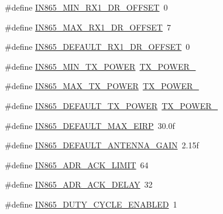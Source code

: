 \begin{DoxyCompactItemize}
\item 
\#define \mbox{\hyperlink{group___r_e_g_i_o_n_i_n865_ga898979e964849e97c76ef8417bf69990}{I\+N865\+\_\+\+M\+I\+N\+\_\+\+R\+X1\+\_\+\+D\+R\+\_\+\+O\+F\+F\+S\+ET}}~0
\item 
\#define \mbox{\hyperlink{group___r_e_g_i_o_n_i_n865_ga3211339c60a66ca9f9baad03eb4546d6}{I\+N865\+\_\+\+M\+A\+X\+\_\+\+R\+X1\+\_\+\+D\+R\+\_\+\+O\+F\+F\+S\+ET}}~7
\item 
\#define \mbox{\hyperlink{group___r_e_g_i_o_n_i_n865_ga6bd4f0c33ab266e3e197db4f45131cae}{I\+N865\+\_\+\+D\+E\+F\+A\+U\+L\+T\+\_\+\+R\+X1\+\_\+\+D\+R\+\_\+\+O\+F\+F\+S\+ET}}~0
\item 
\#define \mbox{\hyperlink{group___r_e_g_i_o_n_i_n865_ga91b8f9bdc09d452a2e6bbbad95544245}{I\+N865\+\_\+\+M\+I\+N\+\_\+\+T\+X\+\_\+\+P\+O\+W\+ER}}~\mbox{\hyperlink{group___r_e_g_i_o_n_gac9747c69350f34d485c3134e5a57655b}{T\+X\+\_\+\+P\+O\+W\+E\+R\+\_}}
\item 
\#define \mbox{\hyperlink{group___r_e_g_i_o_n_i_n865_ga6bd515d7c4fbad47210702da1d9396a3}{I\+N865\+\_\+\+M\+A\+X\+\_\+\+T\+X\+\_\+\+P\+O\+W\+ER}}~\mbox{\hyperlink{group___r_e_g_i_o_n_gab33618449f2a573142c463ab071ef8ed}{T\+X\+\_\+\+P\+O\+W\+E\+R\+\_}}
\item 
\#define \mbox{\hyperlink{group___r_e_g_i_o_n_i_n865_gafdbc3865fbf7785cdee80410d5769f84}{I\+N865\+\_\+\+D\+E\+F\+A\+U\+L\+T\+\_\+\+T\+X\+\_\+\+P\+O\+W\+ER}}~\mbox{\hyperlink{group___r_e_g_i_o_n_gab33618449f2a573142c463ab071ef8ed}{T\+X\+\_\+\+P\+O\+W\+E\+R\+\_}}
\item 
\#define \mbox{\hyperlink{group___r_e_g_i_o_n_i_n865_gababb492eaab442a1921c6e337b76eeb8}{I\+N865\+\_\+\+D\+E\+F\+A\+U\+L\+T\+\_\+\+M\+A\+X\+\_\+\+E\+I\+RP}}~30.\+0f
\item 
\#define \mbox{\hyperlink{group___r_e_g_i_o_n_i_n865_ga7d32a4c9d01cd9a98f4066a659b22a9f}{I\+N865\+\_\+\+D\+E\+F\+A\+U\+L\+T\+\_\+\+A\+N\+T\+E\+N\+N\+A\+\_\+\+G\+A\+IN}}~2.\+15f
\item 
\#define \mbox{\hyperlink{group___r_e_g_i_o_n_i_n865_ga7ac52736577da9a1671230aad8390229}{I\+N865\+\_\+\+A\+D\+R\+\_\+\+A\+C\+K\+\_\+\+L\+I\+M\+IT}}~64
\item 
\#define \mbox{\hyperlink{group___r_e_g_i_o_n_i_n865_ga54e9b88a690a69b222c4a3af1bd3d825}{I\+N865\+\_\+\+A\+D\+R\+\_\+\+A\+C\+K\+\_\+\+D\+E\+L\+AY}}~32
\item 
\#define \mbox{\hyperlink{group___r_e_g_i_o_n_i_n865_gac14e67dc121c84da15e74f9ba87a45eb}{I\+N865\+\_\+\+D\+U\+T\+Y\+\_\+\+C\+Y\+C\+L\+E\+\_\+\+E\+N\+A\+B\+L\+ED}}~1
\item 

\end{DoxyCompactItemize}
